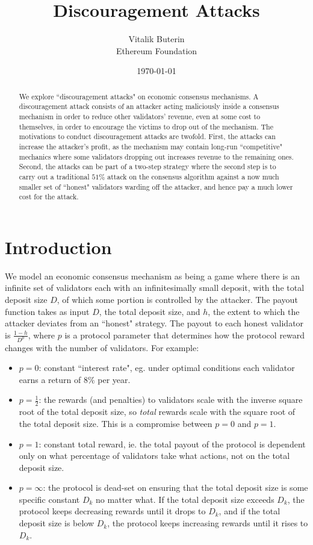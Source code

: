 \documentclass[12pt]{article}
\title{Discouragement Attacks}
\author{
        Vitalik Buterin \\
        Ethereum Foundation
}
\date{\today}
\begin{document}
\maketitle
\begin{abstract}
We explore ``discouragement attacks" on economic consensus mechanisms. A discouragement attack consists of an attacker acting maliciously inside a consensus mechanism in order to reduce other validators' revenue, even at some cost to themselves, in order to encourage the victims to drop out of the mechanism. The motivations to conduct discouragement attacks are twofold. First, the attacks can increase the attacker's profit, as the mechanism may contain long-run ``competitive" mechanics where some validators dropping out increases revenue to the remaining ones. Second, the attacks can be part of a two-step strategy where the second step is to carry out a traditional $51\%$ attack on the consensus algorithm against a now much smaller set of ``honest" validators warding off the attacker, and hence pay a much lower cost for the attack.
\end{abstract}

\section{Introduction}
We model an economic consensus mechanism as being a game where there is an infinite set of validators each with an infinitesimally small deposit, with the total deposit size $D$, of which some portion is controlled by the attacker. The payout function takes as input $D$, the total deposit size, and $h$, the extent to which the attacker deviates from an ``honest" strategy. The payout to each honest validator is $\frac{1-h}{D^p}$, where $p$ is a protocol parameter that determines how the protocol reward changes with the number of validators. For example:

\begin{itemize}
\item $p=0$: constant ``interest rate", eg. under optimal conditions each validator earns a return of $8\%$ per year.
\item $p=\frac{1}{2}$: the rewards (and penalties) to validators scale with the inverse square root of the total deposit size, so \textit{total} rewards scale with the square root of the total deposit size. This is a compromise between $p=0$ and $p=1$. 
\item $p=1$: constant total reward, ie. the total payout of the protocol is dependent only on what percentage of validators take what actions, not on the total deposit size.
\item $p=\infty$: the protocol is dead-set on ensuring that the total deposit size is some specific constant $D_k$ no matter what. If the total deposit size exceeds $D_k$, the protocol keeps decreasing rewards until it drops to $D_k$, and if the total deposit size is below $D_k$, the protocol keeps increasing rewards until it rises to $D_k$.
\end{itemize}
\end{document}
